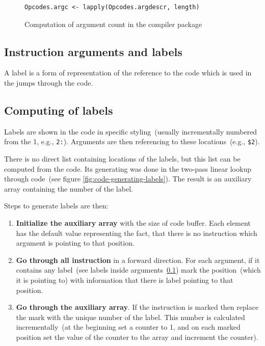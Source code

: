 \documentclass[thesis=M,english]{FITthesis}[2018/10/20]
\newcommand{\code}[1]{\texttt{#1}}
\begin{document}
\begin{figure}[H]
\begin{lstlisting}
Opcodes.argc <- lapply(Opcodes.argdescr, length)
\end{lstlisting}
	\caption{Computation of argument count in the compiler package}\label{fig:computation-of-argc}
\end{figure}

\subsection{Instruction arguments and labels}\label{instruction-arguments-labels}

A label is a form of representation of the reference to the code which is used in the jumps through the code.

\subsection{Computing of labels}

Labels are shown in the code in specific styling~(usually incrementally numbered from the 1, e.g., \code{2:}). Arguments are then referencing to these locations~(e.g., \code{{\$}2}).

There is no direct list containing locations of the labels, but this list can be computed from the code. Its generating was done in the two-pass linear lookup through code~(see figure \ref{fig:code-generating-labels}). The result is an auxiliary array containing the number of the label.

Steps to generate labels are then:
\begin{enumerate}
	\item \textbf{Initialize the auxiliary array} with the size of code buffer. Each element has the default value representing the fact, that there is no instruction which argument is pointing to that position.
	\item \textbf{Go through all instruction} in a forward direction. For each argument, if it contains any label~(see labels inside arguments~\ref{instruction-arguments-labels}) mark the position~(which it is pointing to) with information that there is label pointing to that position.
	\item \textbf{Go through the auxiliary array}. If the instruction is marked then replace the mark with the unique number of the label. This number is calculated incrementally~(at the beginning set a counter to 1, and on each marked position set the value of the counter to the array and increment the counter).
\end{enumerate}
\end{document}
